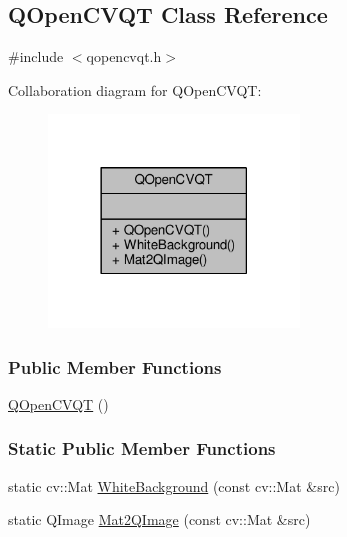 \hypertarget{class_q_open_c_v_q_t}{}\subsection{Q\+Open\+C\+V\+Q\+T Class Reference}
\label{class_q_open_c_v_q_t}


{\ttfamily \#include $<$qopencvqt.\+h$>$}



Collaboration diagram for Q\+Open\+C\+V\+Q\+T\+:
\nopagebreak
\begin{figure}[H]
\begin{center}
\leavevmode
\includegraphics[width=189pt]{class_q_open_c_v_q_t__coll__graph}
\end{center}
\end{figure}
\subsubsection*{Public Member Functions}
\begin{DoxyCompactItemize}
\item 
\hyperlink{class_q_open_c_v_q_t_a6c108b923cac9d18ae3fd75215aca6a5}{Q\+Open\+C\+V\+Q\+T} ()
\end{DoxyCompactItemize}
\subsubsection*{Static Public Member Functions}
\begin{DoxyCompactItemize}
\item 
static cv\+::\+Mat \hyperlink{class_q_open_c_v_q_t_a3aa480e80e8d70328811d0ac75b2df52}{White\+Background} (const cv\+::\+Mat \&src)
\item 
static Q\+Image \hyperlink{class_q_open_c_v_q_t_ab1d34f10d11fbf4ddc00ce55c0255023}{Mat2\+Q\+Image} (const cv\+::\+Mat \&src)
\end{DoxyCompactItemize}


